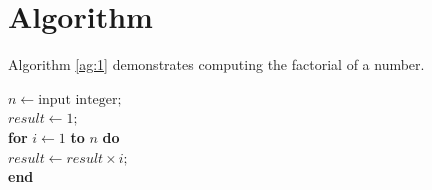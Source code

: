 \documentclass{article}
\begin{document}
	\section{Algorithm}
	Algorithm \ref{ag:1} demonstrates computing the factorial of a number.\\
	
	\begin{algorithm}[H]
		$n \gets \text{input integer};$ \\
		$result \gets 1;$ \\
		\textbf{for } $i \gets 1$ \textbf{ to } $n$ \textbf{ do} \\
		\hspace*{1em}$result \gets result \times i;$ \\
		\textbf{end} \\
		\caption{Compute factorial of an integer}
		\label{ag:1}
	\end{algorithm}
	
\end{document}
